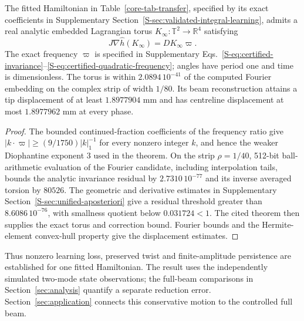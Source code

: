 \begin{theorem}
\label{core-thm-learned-torus}
The fitted Hamiltonian in Table~\ref{core-tab-transfer}, specified by its
exact coefficients in Supplementary
Section~\ref{S-sec:validated-integral-learning}, admits a real analytic
embedded Lagrangian torus $K_\infty:\mathbb T^2\to\mathbb R^4$ satisfying
\begin{equation}
 J\nabla\widehat h(K_\infty)=DK_\infty\varpi.
 \label{core-eq-torus-frequency}
\end{equation}
The exact frequency $\varpi$ is specified in
Supplementary Eqs.~\eqref{S-eq:certified-invariance}--\eqref{S-eq:certified-quadratic-frequency};
angles have period one and time is dimensionless.
The torus is within $2.0894\,10^{-41}$ of the computed Fourier embedding
on the complex strip of width $1/80$. Its beam reconstruction attains
a tip displacement of at least $1.8977904$ mm and has centreline
displacement at most $1.8977962$ mm at every phase.
\end{theorem}
\begin{proof}
The bounded continued-fraction coefficients of the frequency ratio give
$|k\cdot\varpi|\geq(9/1750)|k|_1^{-1}$ for every nonzero integer $k$,
and hence the weaker Diophantine exponent $3$ used in the theorem.
On the strip $\rho=1/40$, 512-bit ball-arithmetic evaluation of the Fourier candidate,
including interpolation tails, bounds the analytic invariance residual
by $2.7310\,10^{-77}$ and its inverse averaged torsion by $80526$.
The geometric and derivative estimates in Supplementary
Section~\ref{S-sec:unified-aposteriori} give a residual threshold greater
than $8.6086\,10^{-76}$, with smallness quotient below $0.031724<1$.
The cited theorem then supplies the exact torus and correction bound.
Fourier bounds and the Hermite-element convex-hull property give the
displacement estimates.
\end{proof}
Thus nonzero learning loss, preserved twist and finite-amplitude
persistence are established for one fitted Hamiltonian. The result uses
the independently simulated two-mode state observations; the full-beam
comparisons in Section~\ref{sec:analysis} quantify a separate reduction
error. Section~\ref{sec:application} connects this conservative motion
to the controlled full beam.

